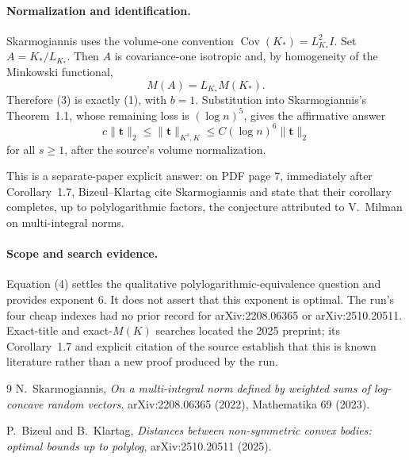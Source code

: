 \documentclass[11pt]{article}
\begin{document}
\pagebreak
\paragraph{Normalization and identification.}
Skarmogiannis uses the volume-one convention
$\operatorname{Cov}(K_*)=L_{K_*}^2 I$.  Set
$A=K_*/L_{K_*}$.  Then $A$ is covariance-one isotropic and, by homogeneity
of the Minkowski functional,
\[
  M(A)=L_{K_*}M(K_*).
\]
Therefore (3) is exactly (1), with $b=1$.  Substitution into
Skarmogiannis's Theorem~1.1, whose remaining loss is $(\log n)^5$, gives
the affirmative answer
\begin{equation}
  c\|\mathbf t\|_2
  \le \|\mathbf t\|_{K^s,K}
  \le C(\log n)^6\|\mathbf t\|_2             \tag{4}
\end{equation}
for all $s\ge1$, after the source's volume normalization.

This is a separate-paper explicit answer: on PDF page 7, immediately after
Corollary~1.7, Bizeul--Klartag cite Skarmogiannis and state that their
corollary completes, up to polylogarithmic factors, the conjecture attributed
to V.~Milman on multi-integral norms.

\paragraph{Scope and search evidence.}
Equation (4) settles the qualitative polylogarithmic-equivalence question and
provides exponent $6$.  It does not assert that this exponent is optimal.
The run's four cheap indexes had no prior record for arXiv:2208.06365 or
arXiv:2510.20511.  Exact-title and exact-$M(K)$ searches located the 2025
preprint; its Corollary~1.7 and explicit citation of the source establish that
this is known literature rather than a new proof produced by the run.

\begin{thebibliography}{9}
N.~Skarmogiannis,
\emph{On a multi-integral norm defined by weighted sums of log-concave
random vectors}, arXiv:2208.06365 (2022), Mathematika 69 (2023).

P.~Bizeul and B.~Klartag,
\emph{Distances between non-symmetric convex bodies: optimal bounds up to
polylog}, arXiv:2510.20511 (2025).
\end{thebibliography}
\end{document}
